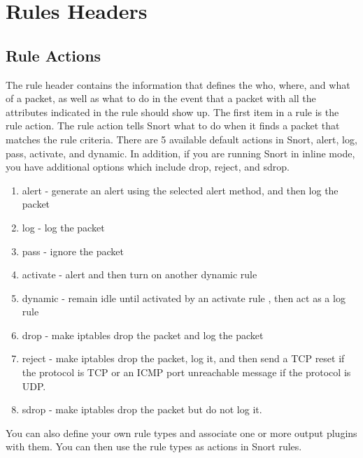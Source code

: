 \documentclass[english]{report}
\begin{document}
\section{Rules Headers}

\subsection{Rule Actions}
\label{rules action section}

The rule header contains the information that defines the who, where, and what
of a packet, as well as what to do in the event that a packet with all the
attributes indicated in the rule should show up. The first item in a rule is
the rule action. The rule action tells Snort what to do when it finds a packet
that matches the rule criteria. There are 5 available default actions in Snort,
alert, log, pass, activate, and dynamic. In addition, if you are running Snort
in inline mode, you have additional options which include drop, reject, and
sdrop. 

\begin{enumerate}

\item alert - generate an alert using the selected alert method, and then
log the packet 

\item log - log the packet 

\item pass - ignore the packet 

\item activate - alert and then turn on another dynamic rule  

\item dynamic - remain idle until activated by an activate rule , then act as a
log rule

\item drop - make iptables drop the packet and log the packet

\item reject - make iptables drop the packet, log it, and then send a TCP reset
if the protocol is TCP or an ICMP port unreachable message if the protocol is
UDP.

\item sdrop - make iptables drop the packet but do not log it.

\end{enumerate}

You can also define your own rule types and associate one or more output
plugins with them. You can then use the rule types as actions in Snort rules.
\end{document}
